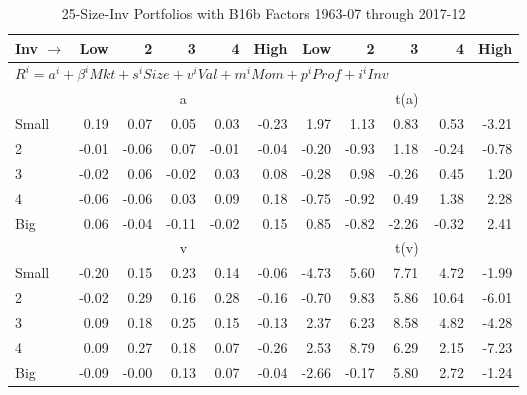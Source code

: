 
\begin{table}[!ht]
\footnotesize
\centering
\caption{25-Size-Inv Portfolios with B16b Factors 1963-07 through 2017-12}
\begin{tabular}{lrrrrrrrrrr}
  \toprule
    Inv $\rightarrow$ & Low & 2 & 3 & 4 & High & Low & 2 & 3 & 4 & High \\ 
  \midrule
  \multicolumn{11}{l}{$R^i=a^i+\beta^iMkt+s^iSize+v^iVal+m^iMom+p^iProf+i^iInv$} \\

  
    
      & \multicolumn{5}{c}{a} & \multicolumn{5}{c}{t(a)}
    
    \\
      \cmidrule(r){2-6} \cmidrule(r){7-11}

    Small   & 0.19  & 0.07  & 0.05  & 0.03  & -0.23  & 1.97  & 1.13  & 0.83  & 0.53  & -3.21  \\
         2  & -0.01  & -0.06  & 0.07  & -0.01  & -0.04  & -0.20  & -0.93  & 1.18  & -0.24  & -0.78  \\
         3  & -0.02  & 0.06  & -0.02  & 0.03  & 0.08  & -0.28  & 0.98  & -0.26  & 0.45  & 1.20  \\
         4  & -0.06  & -0.06  & 0.03  & 0.09  & 0.18  & -0.75  & -0.92  & 0.49  & 1.38  & 2.28  \\
    Big     & 0.06  & -0.04  & -0.11  & -0.02  & 0.15  & 0.85  & -0.82  & -2.26  & -0.32  & 2.41  \\

  
    
      & \multicolumn{5}{c}{v} & \multicolumn{5}{c}{t(v)}
    
    \\
      \cmidrule(r){2-6} \cmidrule(r){7-11}

    Small   & -0.20  & 0.15  & 0.23  & 0.14  & -0.06  & -4.73  & 5.60  & 7.71  & 4.72  & -1.99  \\
         2  & -0.02  & 0.29  & 0.16  & 0.28  & -0.16  & -0.70  & 9.83  & 5.86  & 10.64  & -6.01  \\
         3  & 0.09  & 0.18  & 0.25  & 0.15  & -0.13  & 2.37  & 6.23  & 8.58  & 4.82  & -4.28  \\
         4  & 0.09  & 0.27  & 0.18  & 0.07  & -0.26  & 2.53  & 8.79  & 6.29  & 2.15  & -7.23  \\
    Big     & -0.09  & -0.00  & 0.13  & 0.07  & -0.04  & -2.66  & -0.17  & 5.80  & 2.72  & -1.24  \\

  
    

\end{tabular}
\end{table}
